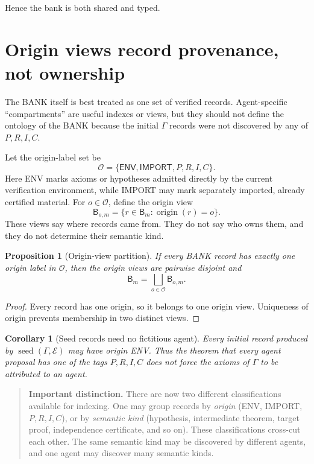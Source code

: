 \documentclass[11pt,openany]{book}
\newtheorem{proposition}[theorem]{Proposition}
\newtheorem{corollary}[theorem]{Corollary}
\theoremstyle{definition}
\theoremstyle{remark}
\newenvironment{warningbox}{\begin{quote}\small\color{red!50!black}\textbf{Important distinction.} }{\end{quote}}
\newcommand{\Bank}{\mathsf{B}}
\newcommand{\Env}{\mathcal{E}}
\begin{document}
Hence the bank is both shared and typed.

\section{Origin views record provenance, not ownership}
The BANK itself is best treated as one set of verified records. Agent-specific ``compartments'' are useful indexes or views, but they should not define the ontology of the BANK because the initial $\Gamma$ records were not discovered by any of $P,R,I,C$.

Let the origin-label set be
\[
\mathcal O=\{\mathsf{ENV},\mathsf{IMPORT},P,R,I,C\}.
\]
Here \textsf{ENV} marks axioms or hypotheses admitted directly by the current verification environment, while \textsf{IMPORT} may mark separately imported, already certified material. For $o\in\mathcal O$, define the origin view
\[
\Bank_{o,m}=\{r\in\Bank_m:\operatorname{origin}(r)=o\}.
\]
These views say where records came from. They do not say who owns them, and they do not determine their semantic kind.

\begin{proposition}[Origin-view partition]\label{prop:originpartition}
If every BANK record has exactly one origin label in $\mathcal O$, then the origin views are pairwise disjoint and
\[
\Bank_m=\bigsqcup_{o\in\mathcal O}\Bank_{o,m}.
\]
\end{proposition}
\begin{proof}
Every record has one origin, so it belongs to one origin view. Uniqueness of origin prevents membership in two distinct views.
\end{proof}

\begin{corollary}[Seed records need no fictitious agent]\label{cor:seedorigin}
Every initial record produced by $\operatorname{seed}(\Gamma,\Env)$ may have origin \textsf{ENV}. Thus the theorem that every \emph{agent proposal} has one of the tags $P,R,I,C$ does not force the axioms of $\Gamma$ to be attributed to an agent.
\end{corollary}

\begin{warningbox}
There are now two different classifications available for indexing. One may group records by \emph{origin} (ENV, IMPORT, $P,R,I,C$), or by \emph{semantic kind} (hypothesis, intermediate theorem, target proof, independence certificate, and so on). These classifications cross-cut each other. The same semantic kind may be discovered by different agents, and one agent may discover many semantic kinds.
\end{warningbox}
\end{document}
